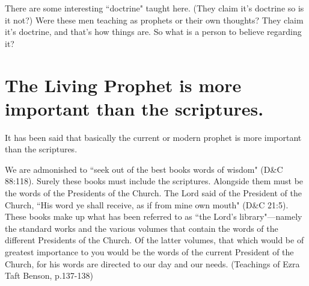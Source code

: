 There are some interesting ``doctrine" taught here. (They claim it's doctrine so
is it not?) Were these men teaching as prophets or their own thoughts? They claim
it's doctrine, and that's how things are. So what is a person to believe regarding
it?

\section{The Living Prophet is more important than the scriptures.}

It has been said that basically the current or modern prophet is more important than
the scriptures.

\begin{displayquote}
We are admonished to ``seek out of the best books words of wisdom" (D\&C 88:118). 
Surely these books must include the scriptures. Alongside them must be the words of 
the Presidents of the Church. The Lord said of the President of the Church, ``His 
word ye shall receive, as if from mine own mouth" (D\&C 21:5). These books make up 
what has been referred to as ``the Lord’s library"—namely the standard works and 
the various volumes that contain the words of the different Presidents of the Church. 
Of the latter volumes, that which would be of greatest importance to you would be 
the words of the current President of the Church, for his words are directed to our 
day and our needs. (Teachings of Ezra Taft Benson, p.137-138)
\end{displayquote}

